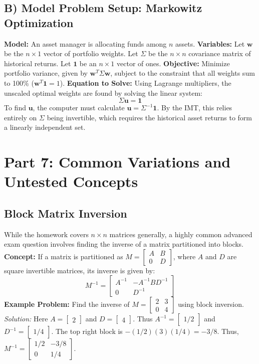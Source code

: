 \documentclass[11pt]{article}
\begin{document}
\subsection*{B) Model Problem Setup: Markowitz Optimization}
\textbf{Model:} An asset manager is allocating funds among $n$ assets.
\textbf{Variables:} Let $\mathbf{w}$ be the $n \times 1$ vector of portfolio weights. Let $\Sigma$ be the $n \times n$ covariance matrix of historical returns. Let $\mathbf{1}$ be an $n \times 1$ vector of ones.
\textbf{Objective:} Minimize portfolio variance, given by $\mathbf{w}^T \Sigma \mathbf{w}$, subject to the constraint that all weights sum to 100\% ($\mathbf{w}^T \mathbf{1} = 1$).
\textbf{Equation to Solve:} Using Lagrange multipliers, the unscaled optimal weights are found by solving the linear system:
\[ \Sigma \mathbf{u} = \mathbf{1} \]
To find $\mathbf{u}$, the computer must calculate $\mathbf{u} = \Sigma^{-1} \mathbf{1}$. By the IMT, this relies entirely on $\Sigma$ being invertible, which requires the historical asset returns to form a linearly independent set.

\section*{Part 7: Common Variations and Untested Concepts}
\subsection*{Block Matrix Inversion}
While the homework covers $n \times n$ matrices generally, a highly common advanced exam question involves finding the inverse of a matrix partitioned into blocks.
\textbf{Concept:} If a matrix is partitioned as $M = \begin{bmatrix} A & B \\ 0 & D \end{bmatrix}$, where $A$ and $D$ are square invertible matrices, its inverse is given by:
\[ M^{-1} = \begin{bmatrix} A^{-1} & -A^{-1} B D^{-1} \\ 0 & D^{-1} \end{bmatrix} \]
\textbf{Example Problem:} Find the inverse of $M = \begin{bmatrix} 2 & 3 \\ 0 & 4 \end{bmatrix}$ using block inversion.
\textit{Solution:} Here $A = \begin{bmatrix} 2 \end{bmatrix}$ and $D = \begin{bmatrix} 4 \end{bmatrix}$. Thus $A^{-1} = \begin{bmatrix} 1/2 \end{bmatrix}$ and $D^{-1} = \begin{bmatrix} 1/4 \end{bmatrix}$. 
The top right block is $-(1/2)(3)(1/4) = -3/8$.
Thus, $M^{-1} = \begin{bmatrix} 1/2 & -3/8 \\ 0 & 1/4 \end{bmatrix}$.
\end{document}
